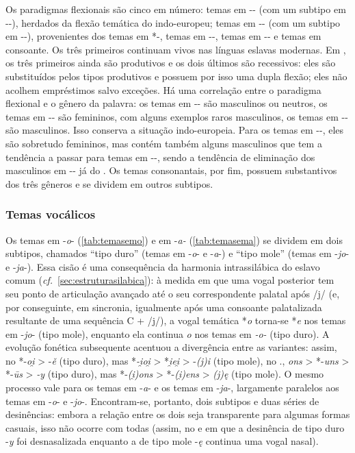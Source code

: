 Os paradigmas flexionais são cinco em número:
temas em -- (com um subtipo em --), herdados da flexão
temática do indo-europeu;
temas em -- (com um subtipo em --), provenientes dos temas em
*-,
temas em --, temas em -- e temas em consoante.
Os três primeiros continuam vivos nas línguas eslavas modernas.
Em , os três primeiros ainda são produtivos e os dois
últimos são recessivos: eles são substituídos pelos tipos produtivos e possuem
por isso uma dupla flexão; eles não acolhem empréstimos salvo exceções.
Há uma correlação entre o paradigma flexional e o gênero da palavra: os temas em
-- são masculinos ou neutros, os temas em -- são femininos,
com alguns exemplos raros masculinos, os temas em -- são masculinos.
Isso conserva a situação indo-europeia.
Para os temas em --, eles são sobretudo femininos, mas contém também
alguns masculinos que tem a tendência a passar para temas em --, sendo
a tendência de eliminação dos masculinos em -- já do
.
Os temas consonantais, por fim, possuem substantivos dos três gêneros e se
dividem em outros subtipos.

\subsubsection{Temas vocálicos}\label{sec:temasvocalicos}

Os temas em -\emph{o}- (\autoref{tab:temasemo}) e em -\emph{a-}
(\autoref{tab:temasema}) se dividem
em dois subtipos, chamados ``tipo duro'' (temas em -\emph{o}- e
-\emph{a}-) e ``tipo mole'' (temas em -\emph{jo}- e -\emph{ja}-). Essa
cisão é uma consequência da harmonia intrassilábica do eslavo comum (\emph{cf.}~\ref{sec:estruturasilabica}): à medida em que uma vogal posterior tem seu ponto de
articulação avançado até o seu correspondente palatal após /j/ (e, por
conseguinte, em sincronia, igualmente após uma consoante palatalizada
resultante de uma sequência C + /j/), a vogal temática *\emph{o}
torna-se *\emph{e} nos temas em -\emph{jo}- (tipo mole), enquanto ela
continua \emph{o} nos temas em \emph{-o-} (tipo duro). A evolução
fonética subsequente acentuou a divergência entre as variantes: assim,
no  *-\emph{oi̯} > -\emph{ě} (tipo duro), mas
*\emph{-i̯oi̯} > *\emph{i̯ei̯} > -\emph{{(j)}i}
(tipo mole), no ., \emph{ons} > *-\emph{uns}
> *-\emph{ūs} > \emph{-y} (tipo duro), mas
*-\emph{{(i̯)}ons} > *-\emph{{(i̯)}ens} >
\emph{{(j)}ę} (tipo mole). O mesmo processo vale para os temas em
-\emph{a}- e os temas em -\emph{ja}-, largamente paralelos aos temas em
-\emph{o}- e -\emph{jo}-. Encontram-se, portanto, dois subtipos e duas
séries de desinências: embora a relação entre os dois seja transparente
para algumas formas casuais, isso não ocorre com todas (assim, no
 e  em que a desinência de tipo duro -\emph{y} foi
desnasalizada enquanto a de tipo mole -\emph{ę} continua uma vogal
nasal).

